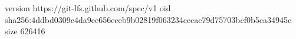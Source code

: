 version https://git-lfs.github.com/spec/v1
oid sha256:4ddbd0309c4da9ee656eceb9b02819f063234cecac79d75703bcf0b5ca34945c
size 626416
